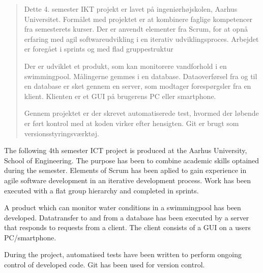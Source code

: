\abstractintoc
\abstractcol
\setlength{\abstitleskip}{-18pt}


\begin{abstract}
Dette 4. semester IKT projekt er lavet på ingeniørhøjskolen, Aarhus Universitet. Formålet med projektet er at kombinere faglige kompetencer fra semesterets kurser. Der er anvendt elementer fra Scrum, for at opnå erfaring med agil softwareudvikling i en iterativ udviklingsproces. Arbejdet er foregået i sprints og med flad gruppestruktur

Der er udviklet et produkt, som kan monitorere vandforhold i en swimmingpool. Målingerne gemmes i en database. Dataoverførsel fra og til en database er sket gennem en server, som modtager forespørgsler fra en klient. Klienten er et GUI på brugerens PC eller smartphone.

Gennem projektet er der skrevet automatiserede test, hvormed der løbende er ført kontrol med at koden virker efter hensigten. Git er brugt som versionsstyringsværktøj. 
\end{abstract}

\begin{abstracten}
The following 4th semester ICT project is produced at the Aarhus University, School of Engineering. The purpose has been to combine academic skills optained during the semester. Elements of Scrum has been aplied to gain experience in agile software development in an iterative development process. Work has been executed with a flat group hierarchy and completed in sprints.

A product which can monitor water conditions in a swimmingpool has been developed. Datatransfer to and from a database has been executed by a server that responds to requests from a client. The client consists of a GUI on a users PC/smartphone.

During the project, automatised tests have been written to perform ongoing control of developed code. Git has been used for version control. 
\end{abstracten}